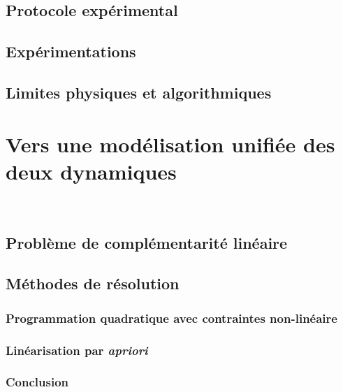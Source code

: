 	\subsection{Protocole expérimental}
	\subsection{Expérimentations}
	\subsection{Limites physiques et algorithmiques}
\section{Vers une modélisation unifiée des deux dynamiques}~
	\subsection{Problème de complémentarité linéaire}
	\subsection{Méthodes de résolution}
		\subsubsection{Programmation quadratique avec contraintes non-linéaire}
		\subsubsection{Linéarisation par \textit{apriori}}
		\subsubsection{Conclusion}